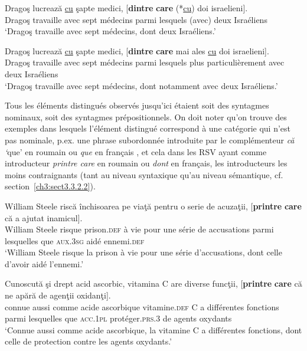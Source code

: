 \ex 
\gll Dragoş  lucrează  \uline{cu}  şapte  medici,  [\textbf{dintre} \textbf{care}  (*\uline{cu})  doi  israelieni]. \label{ch3:ex26b}\\
Dragoş  travaille  avec  sept  médecins  parmi  lesquels  (avec)  deux  Israéliens \\
\glt ‘Dragoş travaille avec sept médecins, dont deux Israéliens.’

\ex 
\gll Dragoş  lucrează  \uline{cu}  şapte  medici,  [\textbf{dintre} \textbf{care}  mai  ales \uline{cu}  doi  israelieni]. \label{ch3:ex26c}\\
Dragoş  travaille  avec  sept  médecins  parmi  lesquels  plus particulièrement avec  deux  Israéliens\\
\glt ‘Dragoş travaille avec sept médecins, dont notamment avec deux Israéliens.’
\z 
\z 

Tous les éléments distingués observés jusqu’ici étaient soit des syntagmes nominaux, soit des syntagmes prépositionnels. On doit noter qu’on trouve des exemples dans lesquels l’élément distingué correspond à une catégorie qui n'est pas nominale, p.ex. une phrase subordonnée introduite par le complémenteur \textit{că} \textit{‘}que’ en roumain  ou \textit{que} en français , et cela dans les RSV ayant comme introducteur \textit{printre care} en roumain ou \textit{dont} en français, {\cad} les introducteurs les moins contraignants (tant au niveau syntaxique qu’au niveau sémantique, cf. section~\ref{ch3:sect3.3.2.2}).

\ea \label{ch3:ex27}
\ea 
\gll William  Steele  riscă  închisoarea  pe  viaţă  pentru  o  serie  de  acuzaţii, [\textbf{printre} \textbf{care}  că  a  ajutat  inamicul]. \label{ch3:ex27a}\\
William  Steele  risque  prison.\textsc{def}  à  vie  pour  une  série  de  accusations 
parmi  lesquelles  que  \textsc{aux.3sg}  aidé  ennemi.\textsc{def} \\
\glt ‘William Steele risque la prison à vie pour une série d’accusations, dont celle d’avoir aidé l’ennemi.’  

\ex 
\gll Cunoscută  şi  drept  acid  ascorbic,  vitamina  C  are  diverse funcţii,  [\textbf{printre}  \textbf{care}  că ne  apără  de  agenţii  oxidanţi]. \label{ch3:ex27b}\\ 
connue  aussi  comme  acide  ascorbique  vitamine.\textsc{def}  C  a  différentes
fonctions  parmi  lesquelles  que  \textsc{acc.1pl}   protéger.\textsc{prs.3} de  agents  oxydants \\
\glt ‘Connue aussi comme acide ascorbique, la vitamine C a différentes fonctions, dont celle de protection contre les agents oxydants.’ 
\z 
\z 


